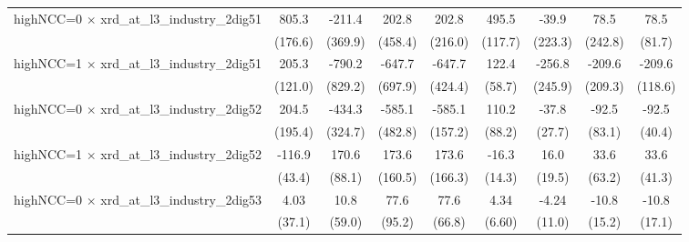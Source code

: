{\begin{tabular}{l*{8}{c}}
\addlinespace
highNCC=0 $\times$ xrd\_at\_l3\_industry\_2dig51&       805.3\sym{***}&      -211.4         &       202.8         &       202.8         &       495.5\sym{***}&       -39.9         &        78.5         &        78.5         \\
                    &     (176.6)         &     (369.9)         &     (458.4)         &     (216.0)         &     (117.7)         &     (223.3)         &     (242.8)         &      (81.7)         \\
\addlinespace
highNCC=1 $\times$ xrd\_at\_l3\_industry\_2dig51&       205.3\sym{*}  &      -790.2         &      -647.7         &      -647.7         &       122.4\sym{**} &      -256.8         &      -209.6         &      -209.6\sym{*}  \\
                    &     (121.0)         &     (829.2)         &     (697.9)         &     (424.4)         &      (58.7)         &     (245.9)         &     (209.3)         &     (118.6)         \\
\addlinespace
highNCC=0 $\times$ xrd\_at\_l3\_industry\_2dig52&       204.5         &      -434.3         &      -585.1         &      -585.1\sym{***}&       110.2         &       -37.8         &       -92.5         &       -92.5\sym{**} \\
                    &     (195.4)         &     (324.7)         &     (482.8)         &     (157.2)         &      (88.2)         &      (27.7)         &      (83.1)         &      (40.4)         \\
\addlinespace
highNCC=1 $\times$ xrd\_at\_l3\_industry\_2dig52&      -116.9\sym{***}&       170.6\sym{*}  &       173.6         &       173.6         &       -16.3         &        16.0         &        33.6         &        33.6         \\
                    &      (43.4)         &      (88.1)         &     (160.5)         &     (166.3)         &      (14.3)         &      (19.5)         &      (63.2)         &      (41.3)         \\
\addlinespace
highNCC=0 $\times$ xrd\_at\_l3\_industry\_2dig53&        4.03         &        10.8         &        77.6         &        77.6         &        4.34         &       -4.24         &       -10.8         &       -10.8         \\
                    &      (37.1)         &      (59.0)         &      (95.2)         &      (66.8)         &      (6.60)         &      (11.0)         &      (15.2)         &      (17.1)         \\

\end{tabular}}
